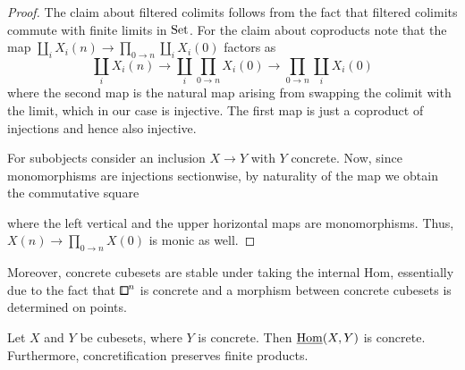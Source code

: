 \begin{proof}
The claim about filtered colimits follows from the fact that filtered colimits commute with finite limits in $\mathrm{Set}$.
For the claim about coproducts note that the map $\coprod_i X_i(n) \to \prod_{0\to n}\coprod_i X_i(0)$ factors as
\[
    \coprod_i X_i(n) \to \coprod_i\prod_{0\to n} X_i(0) \to \prod_{0\to n}\coprod_i X_i(0)
\]
where the second map is the natural map arising from swapping the colimit with the limit,
which in our case is injective.
The first map is just a coproduct of injections and hence also injective.

For subobjects consider an inclusion $X\to Y$ with $Y$ concrete.
Now, since monomorphisms are injections sectionwise,
by naturality of the map we obtain the commutative square
\begin{center}
\end{center}
where the left vertical and the upper horizontal maps are monomorphisms.
Thus, $X(n)\to \prod_{0\to n}X(0)$ is monic as well.
\end{proof}

Moreover, concrete cubesets are stable under taking the internal Hom,
essentially due to the fact that ${\bbox}^n$ is concrete and a morphism between concrete cubesets is determined on points.

\begin{proposition}\label{prop:concrete-ihom-prod}
Let $X$ and $Y$ be cubesets, where $Y$ is concrete.
Then $\underline{\operatorname{Hom}}(X,Y)$ is concrete.
Furthermore, concretification preserves finite products.
\end{proposition}

